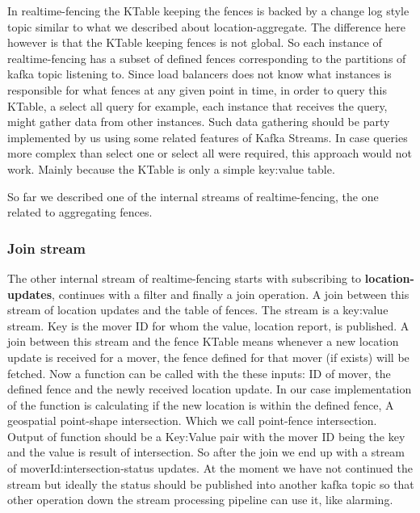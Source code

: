 \documentclass[a4]{report}
\begin{document}
    In realtime-fencing the KTable keeping the fences is backed by a change log style topic similar to what we
    described about location-aggregate.
    The difference here however is that the KTable keeping fences is not global.
    So each instance of realtime-fencing has a subset of defined fences corresponding to the partitions of
    kafka topic listening to.
    Since load balancers does not know what instances is responsible for what fences at any given point in time, in
    order to query this KTable, a select all query for example, each instance that receives the query, might gather
    data from other instances.
    Such data gathering should be party implemented by us using some related features of Kafka Streams.
    In case queries more complex than select one or select all were required, this approach would not work.
    Mainly because the KTable is only a simple key:value table.

    So far we described one of the internal streams of realtime-fencing, the one related to aggregating fences.

    \subsubsection{Join stream}
    The other internal stream of realtime-fencing starts with subscribing to \textbf{location-updates}, continues with a
    filter and finally a join operation.
    A join between this stream of location updates and the table of fences.
    The stream is a key:value stream.
    Key is the mover ID for whom the value, location report, is published.
    A join between this stream and the fence KTable means whenever a new location update is received for a mover,
    the fence defined for that mover (if exists) will be fetched.
    Now a function can be called with the these inputs: ID of mover, the defined fence and the newly received location update.
    In our case implementation of the function is calculating if the new location is within the defined fence, A
    geospatial point-shape intersection.
    Which we call point-fence intersection.
    Output of function should be a Key:Value pair with the mover ID being the key and the value is result of
    intersection.
    So after the join we end up with a stream of moverId:intersection-status updates.
    At the moment we have not continued the stream but ideally the status should be published into another kafka
    topic so that other operation down the stream processing pipeline can use it, like alarming.
\end{document}

